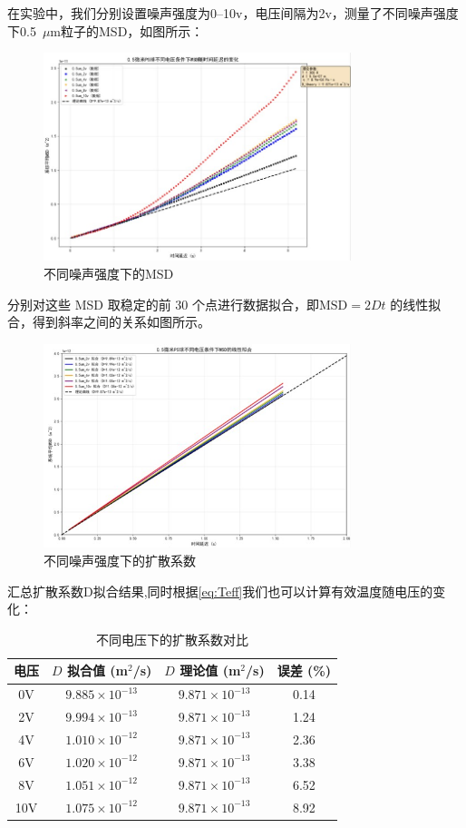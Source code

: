 \documentclass[a4paper]{report} %
\begin{document}
在实验中，我们分别设置噪声强度为0--10v，电压间隔为2v，测量了不同噪声强度下0.5~$\mu$m粒子的MSD，如图所示：\par
\begin{figure}[H]
    \centering
    \includegraphics[width=0.8\textwidth]{不同噪声强度下的MSD.jpg}
    \caption{不同噪声强度下的MSD}
    \label{fig:msdnoise}
\end{figure}
分别对这些 MSD 取稳定的前 30 个点进行数据拟合，即$\text{MSD} = 2Dt$
的线性拟合，得到斜率之间的关系如图所示。
\begin{figure}[H]
    \centering
    \includegraphics[width=0.8\textwidth]{不同噪声强度下的扩散系数.jpg}
    \caption{不同噪声强度下的扩散系数}
    \label{fig:diffusionnoise}
\end{figure}
汇总扩散系数D拟合结果,同时根据\eqref{eq:Teff}我们也可以计算有效温度随电压的变化：
\begin{table}[H]
    \centering
    \caption{不同电压下的扩散系数对比}
    \begin{tabular}{cccc}
        \toprule
        电压 & $D$ 拟合值 (m$^2$/s) & $D$ 理论值 (m$^2$/s) & 误差 (\%) \\
        \midrule
        0V  & $9.885 \times 10^{-13}$ & $9.871 \times 10^{-13}$ & 0.14 \\
        2V  & $9.994 \times 10^{-13}$ & $9.871 \times 10^{-13}$ & 1.24 \\
        4V  & $1.010 \times 10^{-12}$ & $9.871 \times 10^{-13}$ & 2.36 \\
        6V  & $1.020 \times 10^{-12}$ & $9.871 \times 10^{-13}$ & 3.38 \\
        8V  & $1.051 \times 10^{-12}$ & $9.871 \times 10^{-13}$ & 6.52 \\
        10V & $1.075 \times 10^{-12}$ & $9.871 \times 10^{-13}$ & 8.92 \\
        \bottomrule
    \end{tabular}
\end{table}
\end{document}

